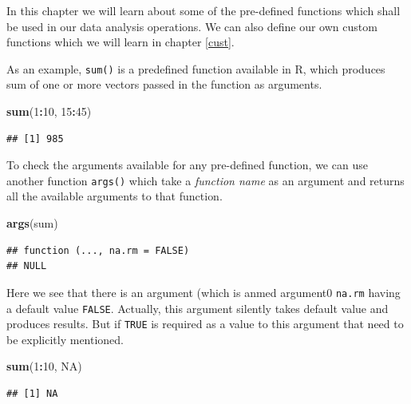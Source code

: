 \documentclass[
]{book}
\newenvironment{Shaded}{\begin{snugshade}}{\end{snugshade}}
\newcommand{\ConstantTok}[1]{\textcolor[rgb]{0.56,0.35,0.01}{#1}}
\newcommand{\DecValTok}[1]{\textcolor[rgb]{0.00,0.00,0.81}{#1}}
\newcommand{\FunctionTok}[1]{\textcolor[rgb]{0.13,0.29,0.53}{\textbf{#1}}}
\newcommand{\NormalTok}[1]{#1}
\newcommand{\SpecialCharTok}[1]{\textcolor[rgb]{0.81,0.36,0.00}{\textbf{#1}}}
\begin{document}
In this chapter we will learn about some of the pre-defined functions which shall be used in our data analysis operations. We can also define our own custom functions which we will learn in chapter \ref{cust}.

As an example, \texttt{sum()} is a predefined function available in R, which produces sum of one or more vectors passed in the function as arguments.

\begin{Shaded}
\begin{Highlighting}[]
\FunctionTok{sum}\NormalTok{(}\DecValTok{1}\SpecialCharTok{:}\DecValTok{10}\NormalTok{, }\DecValTok{15}\SpecialCharTok{:}\DecValTok{45}\NormalTok{)}
\end{Highlighting}
\end{Shaded}

\begin{verbatim}
## [1] 985
\end{verbatim}

To check the arguments available for any pre-defined function, we can use another function \texttt{args()} which take a \emph{function name} as an argument and returns all the available arguments to that function.

\begin{Shaded}
\begin{Highlighting}[]
\FunctionTok{args}\NormalTok{(sum)}
\end{Highlighting}
\end{Shaded}

\begin{verbatim}
## function (..., na.rm = FALSE) 
## NULL
\end{verbatim}

Here we see that there is an argument (which is anmed argument0 \texttt{na.rm} having a default value \texttt{FALSE}. Actually, this argument silently takes default value and produces results. But if \texttt{TRUE} is required as a value to this argument that need to be explicitly mentioned.

\begin{Shaded}
\begin{Highlighting}[]
\FunctionTok{sum}\NormalTok{(}\DecValTok{1}\SpecialCharTok{:}\DecValTok{10}\NormalTok{, }\ConstantTok{NA}\NormalTok{)}
\end{Highlighting}
\end{Shaded}

\begin{verbatim}
## [1] NA
\end{verbatim}
\end{document}

